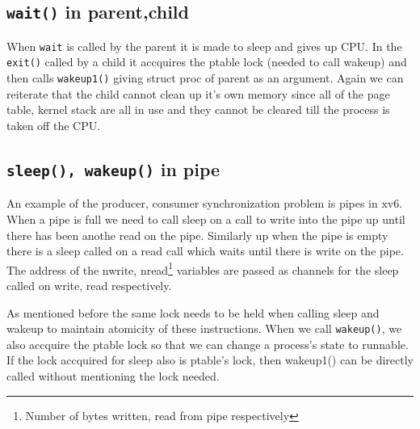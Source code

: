 \documentclass[12pt]{article}
\begin{document}
\subsection{\texttt{wait()} in parent,child}
When \texttt{wait} is called by the parent it is made to sleep and gives up CPU. In the \texttt{exit()} called by a child it 
accquires the ptable lock (needed to call wakeup) and then calls \texttt{wakeup1()} giving struct proc of parent as an argument. Again we can reiterate that the 
child cannot clean up it's own memory since all of the page table, kernel stack are all in use and they cannot be cleared till the process is taken off the CPU. 

\subsection{\texttt{sleep(), wakeup()} in pipe}
An example of the producer, consumer synchronization problem is pipes in xv6. When a pipe is full we need to call sleep on a call to write into the pipe up until there has been anothe read on the pipe. 
Similarly up when the pipe is empty there is a sleep called on a read call which waits until there is write on the pipe. The address of the nwrite, nread\footnote{Number of bytes written, read from pipe respectively} variables are passed as channels for the sleep called on write, read respectively.


As mentioned before the same lock needs to be held when calling sleep and wakeup to maintain atomicity of these instructions. When we call \texttt{wakeup()}, we also accquire the ptable lock so that 
we can change a process's state to runnable. If the lock accquired for sleep also is ptable's lock, then wakeup1() can be directly called without mentioning the lock needed.  
\end{document}
